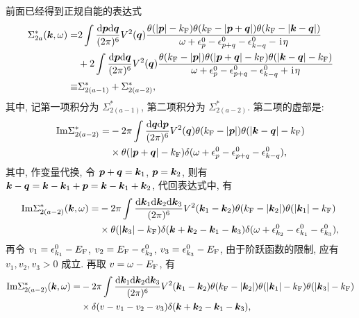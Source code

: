 前面已经得到正规自能的表达式 
  \begin{align}
        \Sigma_{2a}^*(\boldsymbol{k},\omega)=&2\int\frac{\mathrm{d}\boldsymbol{p}\mathrm{d}\boldsymbol{q}}{(2\pi)^6}V^2(\boldsymbol{q})\frac{\theta(|\boldsymbol{p}|-k_{\mathrm{F}})\theta(k_{\mathrm{F}}-|\boldsymbol{p}+\boldsymbol{q}| )\theta(k_{\mathrm{F}}-|\boldsymbol{k}-\boldsymbol{q}|)}{\omega+\epsilon_p^0-\epsilon_{p+q}^0-\epsilon_{k-q}^0-\hspace{0.1em}\mathrm{i}\hspace{0.1em}\eta}\nonumber\\
        &+2\int\frac{\mathrm{d}\boldsymbol{p}\mathrm{d}\boldsymbol{q}}{(2\pi)^6}V^2(\boldsymbol{q})\frac{\theta(k_{\mathrm{F}}-|\boldsymbol{p}|)\theta(|\boldsymbol{p}+\boldsymbol{q}|-k_{\mathrm{F}})\theta(|\boldsymbol{k}-\boldsymbol{q}|-k_{\mathrm{F}})}{\omega+\epsilon_p^0-\epsilon_{p+q}^0-\epsilon_{k-q}^0+\hspace{0.1em}\mathrm{i}\hspace{0.1em}\eta}\nonumber\\
        \equiv &\Sigma_{2(a-1)}^*+\Sigma_{2(a-2)}^*,
    \end{align}
其中, 记第一项积分为 $\Sigma_{2(a-1)}^*$, 第二项积分为 $\Sigma_{2(a-2)}^*$. 第二项的虚部是: 
 \begin{align}
        \mathrm{Im}\Sigma_{2(a-2)}^*=&-2\pi\int\frac{\mathrm{d}\boldsymbol{q}\mathrm{d}\boldsymbol{p}}{(2\pi)^6}V^2(\boldsymbol{q})\theta(k_{\mathrm{F}}-|\boldsymbol{p}|)\theta(|\boldsymbol{k}-\boldsymbol{q}|-k_{\mathrm{F}})\nonumber\\
        &\times \theta(|\boldsymbol{p}+\boldsymbol{q}|-k_{\mathrm{F}})\delta(\omega+\epsilon_p^0-\epsilon_{p+q}^0-\epsilon_{k-q}^0),
    \end{align}
其中, 作变量代换, 令 $\boldsymbol{p}+\boldsymbol{q}=\boldsymbol{k}_1$, $\boldsymbol{p}=\boldsymbol{k}_2$, 则有 $\boldsymbol{k}-\boldsymbol{q}=\boldsymbol{k}-\boldsymbol{k}_1+\boldsymbol{p}=\boldsymbol{k}-\boldsymbol{k}_1+\boldsymbol{k}_2$, 代回表达式中, 有 
  \begin{align}
        \mathrm{Im}\Sigma_{2(a-2)}^*(\boldsymbol{k},\omega)=&-2\pi\int\frac{\mathrm{d}\boldsymbol{k}_1\mathrm{d}\boldsymbol{k}_2\mathrm{d}\boldsymbol{k}_3}{(2\pi)^6}V^2(\boldsymbol{k}_1-\boldsymbol{k}_2)\theta(k_{\mathrm{F}}-|\boldsymbol{k}_2|)\theta(|\boldsymbol{k}_1|-k_{\mathrm{F}})\nonumber\\
        &\times \theta(|\boldsymbol{k}_3|-k_{\mathrm{F}})\delta(\boldsymbol{k}+\boldsymbol{k}_2-\boldsymbol{k}_1-\boldsymbol{k}_3)\delta(\omega+\epsilon_{k_2}^0-\epsilon_{k_1}^0-\epsilon_{k_3}^0),
    \end{align}
再令 $v_1=\epsilon_{k_1}^0-E_{\mathrm{F}}$, $v_2=E_{\mathrm{F}}-\epsilon_{k_2}^0$, $v_3=\epsilon_{k_3}^0-E_{\mathrm{F}}$, 由于阶跃函数的限制, 应有 $v_1,v_2,v_3>0$ 成立. 再取  $v=\omega-E_{\mathrm{F}}$, 有 
 \begin{align}
        \mathrm{Im}\Sigma_{2(a-2)}^*(\boldsymbol{k},\omega)=&-2\pi\int\frac{\mathrm{d}\boldsymbol{k}_1\mathrm{d}\boldsymbol{k}_2\mathrm{d}\boldsymbol{k}_3}{(2\pi)^6}V^2(\boldsymbol{k}_1-\boldsymbol{k}_2)\theta(k_{\mathrm{F}}-|\boldsymbol{k}_2|)\theta(|\boldsymbol{k}_1|-k_{\mathrm{F}})\theta(|\boldsymbol{k}_3|-k_{\mathrm{F}})\nonumber\\ 
&\times\delta(v-v_1-v_2-v_3)\delta(\boldsymbol{k}+\boldsymbol{k}_2-\boldsymbol{k}_1-\boldsymbol{k}_3),
    \end{align}
